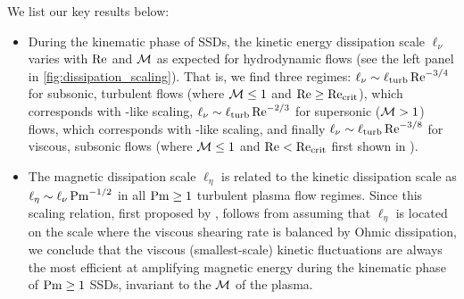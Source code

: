 We list our key results below:
\begin{itemize}
    \item During the kinematic phase of SSDs, the kinetic energy dissipation scale $\ell_\nu$ varies with $\mathrm{Re}$ and $\mathcal{M}$ as expected for hydrodynamic flows (see the left panel in \autoref{fig:dissipation_scaling}). That is, we find three regimes: $\ell_\nu \sim \ell_\mathrm{turb} \,\mathrm{Re}^{-3/4}$ for subsonic, turbulent flows (where $\mathcal{M} \leq 1$ and $\mathrm{Re} \geq \mathrm{Re}_\mathrm{crit}$), which corresponds with \citet{kolmogorov1941dissipation}-like scaling, $\ell_\nu \sim \ell_\mathrm{turb} \,\mathrm{Re}^{-2/3}$ for supersonic ($\mathcal{M} > 1$) flows, which corresponds with \citet{burgers1948_turbulence_model}-like scaling, and finally $\ell_\nu \sim \ell_\mathrm{turb} \,\mathrm{Re}^{-3/8}$ for viscous, subsonic flows (where $\mathcal{M} \leq 1$ and $\mathrm{Re} < \mathrm{Re}_\mathrm{crit}$ first shown in ). \\

    \item The magnetic dissipation scale $\ell_\eta$ is related to the kinetic dissipation scale as $\ell_\eta \sim \ell_\nu \,\mathrm{Pm}^{-1/2}$ in all $\mathrm{Pm} \geq 1$ turbulent plasma flow regimes. Since this scaling relation, first proposed by \citet{schekochihin2002spectra}, follows from assuming that $\ell_\eta$ is located on the scale where the viscous shearing rate is balanced by Ohmic dissipation, we conclude that the viscous (smallest-scale) kinetic fluctuations are always the most efficient at amplifying magnetic energy during the kinematic phase of $\mathrm{Pm} \geq 1$ SSDs, invariant to the $\mathcal{M}$ of the plasma. \\


\end{itemize}
